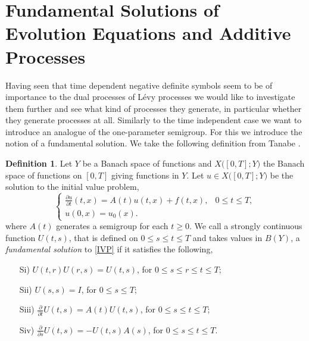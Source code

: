 \documentclass[a4paper, 12pt]{report}
\theoremstyle{cor}
\theoremstyle{remark}
\theoremstyle{definition}
\newtheorem{defn}[theorem]{Definition}
\begin{document}
\section{Fundamental Solutions of Evolution Equations and Additive Processes}\label{Se.FSoEEaAP}

Having seen that time dependent negative definite symbols seem to be of importance to the dual processes of L\'evy processes we would like to investigate them further and see what kind of processes they generate, in particular whether they generate processes at all.  Similarly to the time independent case we want to introduce an analogue of the one-parameter semigroup.  For this we introduce the notion of a fundamental solution.  We take the following definition from Tanabe \cite{Tanabe}.

\begin{defn}
Let $Y$ be a Banach space of functions and $X\big([0, T]; Y\big)$ the Banach space of functions on $[0, T]$ giving functions in $Y$.  Let $u \in X\big([0, T]; Y\big)$ be the solution to the initial value problem,
\begin{equation}\label{IVP}
\begin{cases}
\frac{\partial u}{\partial t}(t, x) = A(t)u(t, x) + f(t, x), & 0 \le t \le T,\\
u(0, x) = u_0(x).
\end{cases}
\end{equation}
where $A(t)$ generates a semigroup for each $t \ge 0$.  We call a strongly continuous function $U(t, s)$, that is defined on $0 \le s \le t \le T$ and takes values in $B(Y)$, a \emph{fundamental solution} to \eqref{IVP} if it satisfies the following,
\begin{itemize}

\item[Si)] $U(t, r)U(r, s) = U(t, s)$, for $0 \le s \le r \le t \le T$;

\item[Sii)] $U(s, s) = I$, for $0 \le s \le T$;

\item[Siii)] $\frac{\partial}{\partial t}U(t, s) = A(t)U(t, s)$, for $0 \le s \le t \le T$;

\item[Siv)] $\frac{\partial}{\partial s}U(t, s) = -U(t, s)A(s)$, for $0 \le s \le t \le T$.

\end{itemize}
\end{defn}
\end{document}
